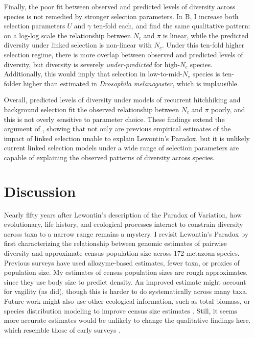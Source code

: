 \documentclass[9pt,lineno]{elife}
\begin{document}
Finally, the poor fit between observed and predicted levels of diversity across
species is not remedied by stronger selection parameters. In
B, I increase both selection parameters $U$
and $\gamma$ ten-fold each, and find the same qualitative pattern: on a log-log
scale the relationship between $N_c$ and $\pi$ is linear, while the predicted
diversity under linked selection is non-linear with $N_c$. Under this ten-fold
higher selection regime, there is more overlap between observed and predicted
levels of diversity, but diversity is severely \emph{under-predicted} for
high-$N_c$ species. Additionally, this would imply that selection in
low-to-mid-$N_c$ species is ten-folder higher than estimated in
\emph{Drosophila melanogaster}, which is implausible.

Overall, predicted levels of diversity under models of recurrent hitchhiking
and background selection fit the observed relationship between $N_c$ and $\pi$
poorly, and this is not overly sensitive to parameter choice. These findings
extend the argument of \cite{Coop2016-gx}, showing that not only are previous
empirical estimates of the impact of linked selection unable to explain
Lewontin's Paradox, but it is unlikely current linked selection models under a
wide range of selection parameters are capable of explaining the observed
patterns of diversity across species.

\section{Discussion}

Nearly fifty years after Lewontin's description of the Paradox of Variation,
how evolutionary, life history, and ecological processes interact to constrain
diversity across taxa to a narrow range remains a mystery. I revisit Lewontin's
Paradox by first characterizing the relationship between genomic estimates of
pairwise diversity and approximate census population size across 172 metazoan
species. Previous surveys have used allozyme-based estimates, fewer taxa, or
proxies of population size. My estimates of census population sizes are rough
approximates, since they use body size to predict density. An improved estimate
might account for vagility (as \cite{Soule1976-he} did), though this is harder
to do systematically across many taxa. Future work might also use other
ecological information, such as total biomass, or species distribution modeling
to improve census size estimates \citep{Bar-On2018-kc,Mora2011-wm}.  Still, it
seems more accurate estimates would be unlikely to change the qualitative
findings here, which resemble those of early surveys
\citep{Nei1984-zi,Soule1976-he}.
\end{document}
